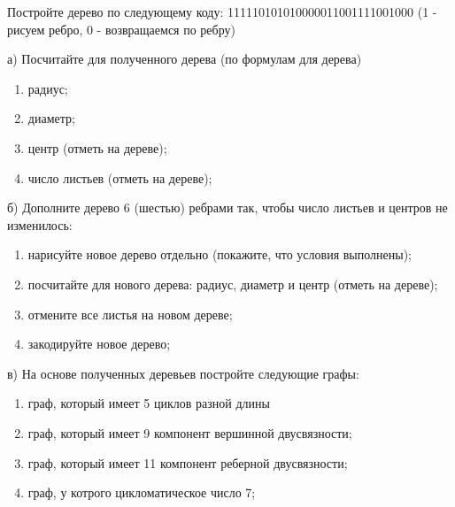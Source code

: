 \question 
Постройте дерево по следующему коду: 111110101010000011001111001000 (1 - рисуем ребро, 0 - возвращаемся по ребру)

а) Посчитайте для полученного дерева (по формулам для дерева)
\begin{enumerate}
\item радиус;
\item диаметр;
\item центр (отметь на дереве);
\item число листьев (отметь на дереве);
\end{enumerate}

б) Дополните дерево 6 (шестью) ребрами так, чтобы число листьев и центров не изменилось:
\begin{enumerate}
\item нарисуйте новое дерево отдельно (покажите, что условия выполнены);
\item посчитайте для нового дерева: радиус, диаметр и центр (отметь на дереве);
\item отмените все листья на  новом дереве;
\item закодируйте новое дерево;
\end{enumerate}

в) На основе полученных деревьев  постройте следующие графы:
\begin{enumerate}
\item граф, который имеет 5 циклов разной длины
\item граф, который имеет 9 компонент вершинной двусвязности;
\item граф, который имеет 11 компонент реберной двусвязности;
\item граф, у котрого цикломатическое число 7;
\end{enumerate}